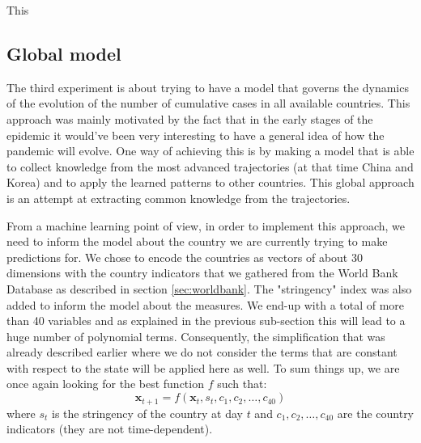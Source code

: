 \documentclass[12pt, letterpaper]{article}
\begin{document}
This 

\subsection{Global model}\label{sec:global}

The third experiment is about trying to have a model that governs the dynamics of the evolution of the number of cumulative cases in all available countries.
This approach was mainly motivated by the fact that in the early stages of the epidemic it would've been very interesting to have a general idea of how the pandemic will evolve.
One way of achieving this is by making a model that is able to collect knowledge from the most advanced trajectories (at that time China and Korea) and to apply the learned patterns to other countries.
This global approach is an attempt at extracting common knowledge from the trajectories.

From a machine learning point of view, in order to implement this approach, we need to inform the model about the country we are currently trying to make predictions for.
We chose to encode the countries as vectors of about 30 dimensions with the country indicators that we gathered from the World Bank Database as described in section \ref{sec:worldbank}.
The "stringency" index was also added to inform the model about the measures.
We end-up with a total of more than 40 variables and as explained in the previous sub-section this will lead to a huge number of polynomial terms.
Consequently, the simplification that was already described earlier where we do not consider the terms that are constant with respect to the state will be applied here as well.
To sum things up, we are once again looking for the best function $f$ such that:
$$\mathbf{x}_{t+1} = f(\mathbf{x}_t, s_t, c_1, c_2, \dots, c_{40})$$
where $s_t$ is the stringency of the country at day $t$ and $c_1, c_2, \dots, c_{40}$ are the country indicators (they are not time-dependent).
\end{document}
